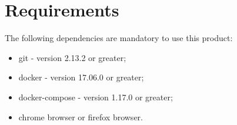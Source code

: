 \section{Requirements}

The following dependencies are mandatory to use this product:
\begin{itemize}
   \item git - version 2.13.2 or greater;
   \item docker - version 17.06.0 or greater;
   \item docker-compose - version 1.17.0 or greater;
   \item chrome browser or firefox browser.
\end{itemize}